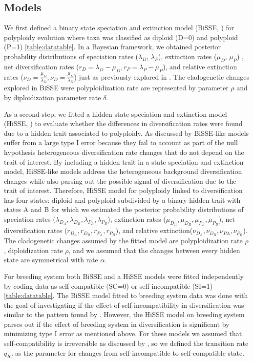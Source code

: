 \subsection{Models}
We first defined a binary state speciation and extinction model (BiSSE, \citet{maddison_2007})  for polyploidy evolution where taxa was classified as diploid (D=0) and polyploid (P=1) \cref{table:datatable}. In  a Bayesian framework, we obtained posterior probability distributions of speciation rates ($\lambda_D$, $\lambda_P$), extinction rates ($\mu_D$, $\mu_P$) , net diversification rates ($r_D=\lambda_D-\mu_D, r_P=\lambda_P-\mu_P$), and  relative extinction rates ($\nu_D=\frac{\mu_D}{\lambda_D}, \nu_D=\frac{\mu_D}{\lambda_D}$) just as previously explored in \citet{mayrose_2011}. The cladogenetic changes explored in BiSSE were polyploidization rate are represented by parameter $\rho$ and by diploidization parameter rate $\delta$.\newline 

As a second step, we fitted a hidden state speciation and extinction model (HiSSE, \citet{beaulieu_2016}) to evaluate whether the differences in diversification rates were found due to a hidden trait associated to polyploidy. As discussed by \citet{beaulieu_2016} BiSSE-like models suffer from a large type I error because they fail to account as part of the null hypothesis heterogeneous diversification rate changes  that do not depend on the trait of interest. By including a hidden trait in a state speciation and extinction  model,  HiSSE-like models address the heterogeneous background diversification changes while also parsing out the possible signal of diversification due to the trait of interest. Therefore, HiSSE model for polyploidy linked to diversification has four states: diploid and polyploid subdivided by a binary hidden trait with states A and B for which we estimated the posterior probability distributions of speciation rates ($\lambda_{D_A},\lambda_{D_B}, \lambda_{P_A},\lambda_{P_B}$), extinction rates ($\mu_{D_A},\mu_{D_B}, \mu_{P_A},\mu_{P_B}$),  net diversification rates ($r_{D_A},r_{D_B},r_{P_A},r_{P_B}$), and relative extinction($\nu_{D_A},\nu_{D_B}, \nu_{PA},\nu_{P_B}$). The cladogenetic changes assumed by the fitted model are polyploidization rate $\rho$, diploidization rate $\rho$, and we assumed that the changes between every hidden state are symmetrical with rate $\alpha$. \newline

For breeding system both BiSSE and a HiSSE models were fitted independently by coding data as self-compatible (SC=0) or self-incompatible (SI=1) \cref{table:datatable}. The BiSSE model fitted to breeding system data was done with the goal of investigating if the effect of self-incompatibility in diversification was similar to the pattern found by  \citet{goldberg_2012}. However, the HiSSE model on breeding system parses out if the effect of breeding system in diversification is significant  by minimizing type I error as mentioned above. For these models we assumed that self-compatibility is irreversible as discussed by \citet{igic_2013}, so we defined the transition rate $q_{IC}$ as the parameter for changes from self-incompatible to self-compatible state.\newline

